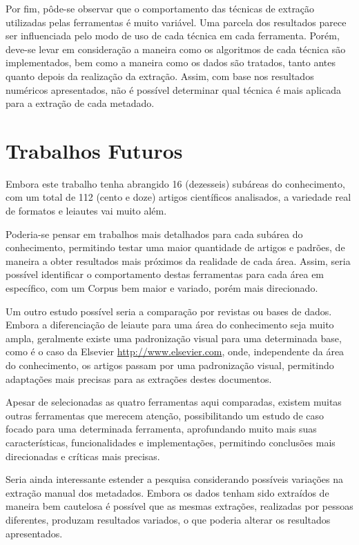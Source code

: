 Por fim, pôde-se observar que o comportamento das técnicas de extração utilizadas pelas ferramentas é muito variável. Uma parcela dos resultados parece ser influenciada pelo modo de uso de cada técnica em cada ferramenta. Porém, deve-se levar em consideração a maneira como os algoritmos de cada técnica são implementados, bem como a maneira como os dados são tratados, tanto antes quanto depois da realização da extração. Assim, com base nos resultados numéricos apresentados, não é possível determinar qual técnica é mais aplicada para a extração de cada metadado.

\section{Trabalhos Futuros}
\label{sec:future-work}

Embora este trabalho tenha abrangido 16 (dezesseis) subáreas do conhecimento, com um total de 112 (cento e doze) artigos científicos analisados, a variedade real de formatos e leiautes vai muito além.

Poderia-se pensar em trabalhos mais detalhados para cada subárea do conhecimento, permitindo testar uma maior quantidade de artigos e padrões, de maneira a obter resultados mais próximos da realidade de cada área. Assim, seria possível identificar o comportamento destas ferramentas para cada área em específico, com um Corpus bem maior e variado, porém mais direcionado.

Um outro estudo possível seria a comparação por revistas ou bases de dados. Embora a diferenciação de leiaute para uma área do conhecimento seja muito ampla, geralmente existe uma padronização visual para uma determinada base, como é o caso da Elsevier \url{http://www.elsevier.com}, onde, independente da área do conhecimento, os artigos passam por uma padronização visual, permitindo adaptações mais precisas para as extrações destes documentos. 

Apesar de selecionadas as quatro ferramentas aqui comparadas, existem muitas outras ferramentas que merecem atenção, possibilitando um estudo de caso focado para uma determinada ferramenta, aprofundando muito mais suas características, funcionalidades e implementações, permitindo conclusões mais direcionadas e críticas mais precisas.

Seria ainda interessante estender a pesquisa considerando possíveis variações na extração manual dos metadados. Embora os dados tenham sido extraídos de maneira bem cautelosa é possível que as mesmas extrações, realizadas por pessoas diferentes, produzam resultados variados, o que poderia alterar os resultados apresentados.

